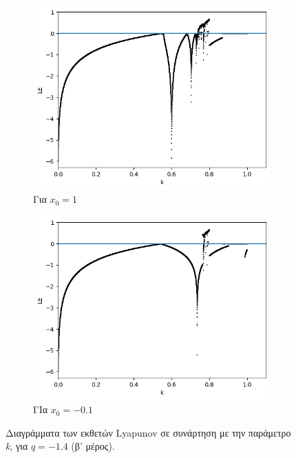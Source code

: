 \begin{figure}[ht]
	\centering

	\begin{subfigure}[b]{1\textwidth}
		\centering
		\includegraphics[width=\textwidth]{LateX images/graphs q14/g8}
		\caption{Για \(x_0=1\)}
		\label{f:g25}
	\end{subfigure}
	\hfill
	\begin{subfigure}[b]{1\textwidth}
		\centering
		\includegraphics[width=\textwidth]{LateX images/graphs q14/g9}
		\caption{ΓΙα \(x_0=-0.1\)}
		\label{f:g26}
	\end{subfigure}
	\hfill
	\caption{ Διαγράμματα των εκθετών Lyapunov σε συνάρτηση με την παράμετρο \emph{k}, για  $q=-1.4$ (β' μέρος).}
	\label{f:g2333}
\end{figure}

